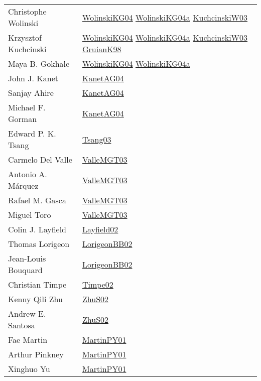 {\begin{longtable}{p{4cm}p{15cm}}
Christophe Wolinski & \href{papers/WolinskiKG04.pdf}{WolinskiKG04}\cite{WolinskiKG04} \href{papers/WolinskiKG04a.pdf}{WolinskiKG04a}\cite{WolinskiKG04a} \href{articles/KuchcinskiW03.pdf}{KuchcinskiW03}\cite{KuchcinskiW03} \\
Krzysztof Kuchcinski & \href{papers/WolinskiKG04.pdf}{WolinskiKG04}\cite{WolinskiKG04} \href{papers/WolinskiKG04a.pdf}{WolinskiKG04a}\cite{WolinskiKG04a} \href{articles/KuchcinskiW03.pdf}{KuchcinskiW03}\cite{KuchcinskiW03} \href{papers/GruianK98.pdf}{GruianK98}\cite{GruianK98} \\
Maya B. Gokhale & \href{papers/WolinskiKG04.pdf}{WolinskiKG04}\cite{WolinskiKG04} \href{papers/WolinskiKG04a.pdf}{WolinskiKG04a}\cite{WolinskiKG04a} \\
John J. Kanet & \href{}{KanetAG04}\cite{KanetAG04} \\
Sanjay Ahire & \href{}{KanetAG04}\cite{KanetAG04} \\
Michael F. Gorman & \href{}{KanetAG04}\cite{KanetAG04} \\
Edward P. K. Tsang & \href{articles/Tsang03.pdf}{Tsang03}\cite{Tsang03} \\
Carmelo Del Valle & \href{papers/ValleMGT03.pdf}{ValleMGT03}\cite{ValleMGT03} \\
Antonio A. M{\'{a}}rquez & \href{papers/ValleMGT03.pdf}{ValleMGT03}\cite{ValleMGT03} \\
Rafael M. Gasca & \href{papers/ValleMGT03.pdf}{ValleMGT03}\cite{ValleMGT03} \\
Miguel Toro & \href{papers/ValleMGT03.pdf}{ValleMGT03}\cite{ValleMGT03} \\
Colin J. Layfield & \href{}{Layfield02}\cite{Layfield02} \\
Thomas Lorigeon & \href{articles/LorigeonBB02.pdf}{LorigeonBB02}\cite{LorigeonBB02} \\
Jean{-}Louis Bouquard & \href{articles/LorigeonBB02.pdf}{LorigeonBB02}\cite{LorigeonBB02} \\
Christian Timpe & \href{articles/Timpe02.pdf}{Timpe02}\cite{Timpe02} \\
Kenny Qili Zhu & \href{papers/ZhuS02.pdf}{ZhuS02}\cite{ZhuS02} \\
Andrew E. Santosa & \href{papers/ZhuS02.pdf}{ZhuS02}\cite{ZhuS02} \\
Fae Martin & \href{articles/MartinPY01.pdf}{MartinPY01}\cite{MartinPY01} \\
Arthur Pinkney & \href{articles/MartinPY01.pdf}{MartinPY01}\cite{MartinPY01} \\
Xinghuo Yu & \href{articles/MartinPY01.pdf}{MartinPY01}\cite{MartinPY01} \\

\end{longtable}}
